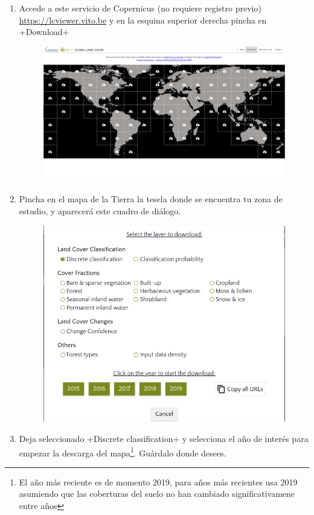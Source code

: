 \documentclass[a4paper,11pt]{article}
\begin{document}
      \begin{enumerate}
       \item Accede a este servicio de Copernicus (no requiere registro previo) \url{https://lcviewer.vito.be} y en la esquina superior derecha pincha en \cverb+Download+
       \begin{figure}[H]\centering
        \includegraphics[width=\textwidth]{clc_web}
       \end{figure}
       
       \item Pincha en el mapa de la Tierra la tesela donde se encuentra tu zona de estudio, y aparecerá este cuadro de diálogo.
       \begin{figure}[H]\centering
        \includegraphics[width=\textwidth]{clc_download_options}
       \end{figure}
       \item Deja seleccionado \cverb+Discrete classification+ y selecciona el año de interés para empezar la descarga del mapa\footnote{El año más reciente es de momento 2019, para años más recientes usa 2019 asumiendo que las coberturas del suelo no han cambiado significativamene entre años}. Guárdalo donde desees.
      \end{enumerate}
      
\end{document}
